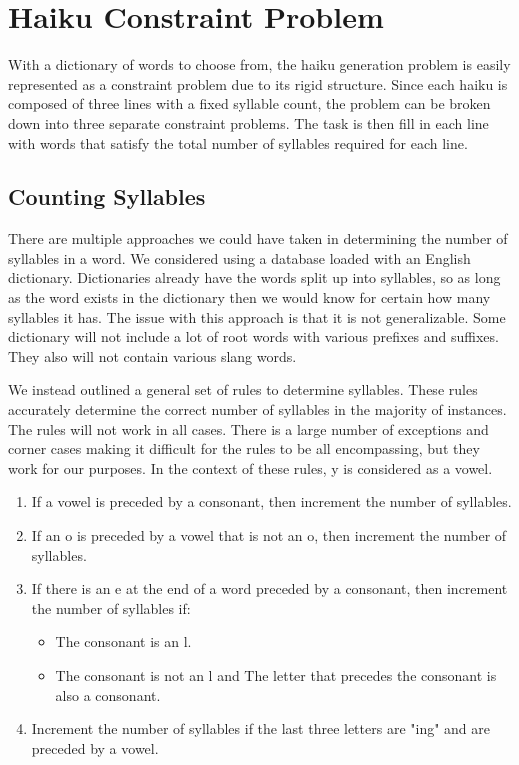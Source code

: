\documentclass[]{article}
\begin{document}
\section{Haiku Constraint Problem}
With a dictionary of words to choose from, the haiku generation problem is easily represented as a constraint problem due to its rigid structure. Since each haiku is composed of three lines with a fixed syllable count, the problem can be broken down into three separate constraint problems. The task is then fill in each line with words that satisfy the total number of syllables required for each line.

\subsection{Counting Syllables}
There are multiple approaches we could have taken in determining the number of syllables in a word. We considered using a database loaded with an English dictionary. Dictionaries already have the words split up into syllables, so as long as the word exists in the dictionary then we would know for certain how many syllables it has. The issue with this approach is that it is not generalizable. Some dictionary will not include a lot of root words with various prefixes and suffixes. They also will not contain various slang words.

We instead outlined a general set of rules to determine syllables. These rules accurately determine the correct number of syllables in the majority of instances. The rules will not work in all cases. There is a large number of exceptions and corner cases making it difficult for the rules to be all encompassing, but they work for our purposes. In the context of these rules, y is considered as a vowel.
\begin{enumerate}
	\item If a vowel is preceded by a consonant, then increment the number of syllables.
	\item If an o is preceded by a vowel that is not an o, then increment the number of syllables.
	\item If there is an e at the end of a word preceded by a consonant, then increment the number of syllables if:
	\begin{itemize}
		\item The consonant is an l.
		\item The consonant is not an l and The letter that precedes the consonant is also a consonant.
	\end{itemize}
	\item Increment the number of syllables if the last three letters are "ing" and are preceded by a vowel.
\end{enumerate}
\end{document}
